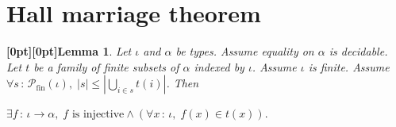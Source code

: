 \documentclass{article}
\makeatletter
\newcommand{\paperanchor}[1]{\hypertarget{#1}{}}%
\def\paperdest{\pdfextension dest}\def\paperstart{\pdfextension startlink}%
\def\paperend{\pdfextension endlink}\def\papercolor{\pdfextension colorstack}%
\let\paperdest\pdfdest\let\paperstart\pdfstartlink\let\paperend\pdfendlink\let\papercolor\pdfcolorstack
\newcommand{\paperanchor}[1]{\paperdest name{#1} xyz}%
\newcommand{\paperanchor}[1]{\special{pdf:dest (#1) [@thispage /XYZ null @ypos null]}}%
\newcommand{\paperlineanchor}[1]{\raisebox{10pt}[0pt][0pt]{\paperanchor{#1}}}
\DeclareRobustCommand{\paperresultname}[1]{\paperlineanchor{theorem:\arabic{theorem}}#1}
\theoremstyle{paperresult}
\newtheorem{lemma}[theorem]{\paperresultname{Lemma}}
\makeatother
\begin{document}
\section{Hall marriage theorem}
\begin{lemma}\label{theorem:6}
Let \(\iota\) and \(\alpha\) be types. Assume equality on \(\alpha\) is decidable. Let \(t\) be a family of finite subsets of \(\alpha\) indexed by \(\iota\). Assume \(\iota\) is finite. Assume \(\forall s\, :\, \mathcal{P}_{\mathrm{fin}}(\iota),\; \left|s\right| \le \left|\bigcup_{i\in s} t(i)\right|\). Then
\begin{center}
\(\displaystyle \exists f\, :\, \iota \to \alpha,\; f\text{ is injective} \land (\forall x\, :\, \iota,\; f(x) \in t(x)).\)
\end{center}
\end{lemma}
\end{document}

